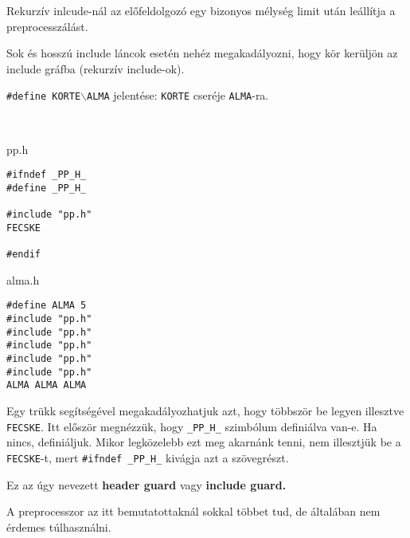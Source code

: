 \documentclass[a4paper,11.5pt]{article}
\begin{document}
	Rekurzív inlcude-nál az előfeldolgozó egy bizonyos mélység limit után leállítja a preprocesszálást.
	
  Sok és hosszú include láncok esetén nehéz megakadályozni, hogy kör kerüljön az include gráfba (rekurzív include-ok).
	\begin{note}
		\texttt{\#define KORTE$\backslash$ALMA} jelentése: \texttt{KORTE} cseréje \texttt{ALMA}-ra.
	\end{note}
	\begin{example}\ 
		
		pp.h
		\begin{lstlisting}
#ifndef _PP_H_
#define _PP_H_

#include "pp.h"
FECSKE

#endif
		\end{lstlisting}
		
		alma.h
		\begin{lstlisting}
#define ALMA 5
#include "pp.h"
#include "pp.h"
#include "pp.h"
#include "pp.h"
#include "pp.h"
ALMA ALMA ALMA
		\end{lstlisting}
	\end{example}
	
	Egy trükk segítségével megakadályozhatjuk azt, hogy többször be legyen illesztve \texttt{FECSKE}. Itt először megnézzük, hogy \texttt{\_PP\_H\_} szimbólum definiálva van-e. Ha nincs, definiáljuk. Mikor legközelebb ezt meg akarnánk tenni, nem illesztjük be a \texttt{FECSKE}-t, mert \texttt{\#ifndef \_PP\_H\_} kivágja azt a szövegrészt.
	
  Ez az úgy nevezett \textbf{header guard} vagy \textbf{include guard.}
	
	\medskip
	A preprocesszor az itt bemutatottaknál sokkal többet tud, de általában nem érdemes túlhasználni.
\end{document}
